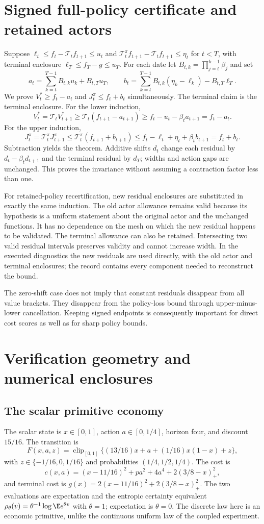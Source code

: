 \documentclass[ecta,nameyear,draft]{econsocart}
\begin{document}
\section{Signed full-policy certificate and retained actors}
Suppose $\ell_t\leq f_t-\mathcal T_tf_{t+1}\leq u_t$ and
$\mathcal T_t^\pi f_{t+1}-\mathcal T_tf_{t+1}\leq\eta_t$ for $t<T$, with terminal enclosure $\ell_T\leq f_T-g\leq u_T$.
For each date let $B_{t,k}=\prod_{j=t}^{k-1}\beta_j$ and set
\[
 a_t=\sum_{k=t}^{T-1}B_{t,k}u_k+B_{t,T}u_T,
 \qquad
 b_t=\sum_{k=t}^{T-1}B_{t,k}(\eta_k-\ell_k)-B_{t,T}\ell_T.
\]
We prove $V_t^*\geq f_t-a_t$ and $J_t^\pi\leq f_t+b_t$ simultaneously. The terminal claim is the terminal enclosure. For the lower induction,
\[
 V_t^*=\mathcal T_tV_{t+1}^*
 \geq\mathcal T_t(f_{t+1}-a_{t+1})
 \geq f_t-u_t-\beta_ta_{t+1}=f_t-a_t.
\]
For the upper induction,
\[
 J_t^\pi=\mathcal T_t^\pi J_{t+1}^\pi
 \leq\mathcal T_t^\pi(f_{t+1}+b_{t+1})
 \leq f_t-\ell_t+\eta_t+\beta_tb_{t+1}=f_t+b_t.
\]
Subtraction yields the theorem. Additive shifts $d_t$ change each residual by $d_t-\beta_td_{t+1}$ and the terminal residual by $d_T$; widths and action gaps are unchanged. This proves the invariance without assuming a contraction factor less than one.

For retained-policy recertification, new residual enclosures are substituted in exactly the same induction. The old actor allowance remains valid because its hypothesis is a uniform statement about the original actor and the unchanged functions. It has no dependence on the mesh on which the new residual happens to be validated. The terminal allowance can also be retained. Intersecting two valid residual intervals preserves validity and cannot increase width. In the executed diagnostics the new residuals are used directly, with the old actor and terminal enclosures; the record contains every component needed to reconstruct the bound.

The zero-shift case does not imply that constant residuals disappear from all value brackets. They disappear from the policy-loss bound through upper-minus-lower cancellation. Keeping signed endpoints is consequently important for direct cost scores as well as for sharp policy bounds.

\section{Verification geometry and numerical enclosures}
\subsection{The scalar primitive economy}
The scalar state is $x\in[0,1]$, action $a\in[0,1/4]$, horizon four, and discount $15/16$. The transition is
\[
 F(x,a,z)=\operatorname{clip}_{[0,1]}
       \{(13/16)x+a+(1/16)x(1-x)+z\},
\]
with $z\in\{-1/16,0,1/16\}$ and probabilities $(1/4,1/2,1/4)$. The cost is
\[
 c(x,a)=(x-11/16)^2+pa^2+4a^4+2(3/8-x)_+^2,
\]
and terminal cost is $g(x)=2(x-11/16)^2+2(3/8-x)_+^2$. The two evaluations are expectation and the entropic certainty equivalent $\rho_\theta(v)=\theta^{-1}\log\E e^{\theta v}$ with $\theta=1$; expectation is $\theta=0$. The discrete law here is an economic primitive, unlike the continuous uniform law of the coupled experiment.
\end{document}
